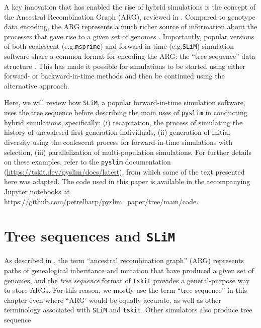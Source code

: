 \documentclass[12pt]{article}
\newcommand{\msprime}[0]{\texttt{msprime}\xspace}
\newcommand{\tskit}[0]{\texttt{tskit}\xspace}
\newcommand{\slim}[0]{\texttt{SLiM}\xspace}
\newcommand{\pyslim}[0]{\texttt{pyslim}\xspace}
\newcommand*{\eg}{e.g.\xcomma}
\begin{document}

A key innovation that has enabled the rise of hybrid simulations is the concept of the Ancestral Recombination Graph (ARG), reviewed in \citet{wong_general_2024}.
Compared to genotype data encoding, the ARG represents a much richer source of information about the processes that gave rise to a given set of genomes \citep{kelleher_efficient_2016}.
Importantly, popular versions of both coalescent (\eg \msprime) and forward-in-time (\eg \slim) simulation software share a common format for
encoding the ARG: the ``tree sequence'' data structure \citep{baumdicker_efficient_2022, haller_tree-sequence_2019}.
This has made it possible for simulations to be started using either forward- or backward-in-time
methods and then be continued using the alternative approach.

Here, we will review how \slim, a popular forward-in-time simulation software, uses the tree sequence before describing
the main uses of \pyslim in conducting hybrid simulations, specifically:
(i) recapitation, the process of simulating the history of uncoalesed first-generation individuals,
(ii) generation of initial diversity using the coalescent process for forward-in-time simulations with selection,
(iii) parallelization of multi-population simulations.
For further details on these examples, refer to the \pyslim{} documentation (\url{https://tskit.dev/pyslim/docs/latest}), from which some of the text presented here was adapted.
The code used in this paper is available in the accompanying Jupyter notebooks at \url{https://github.com/petrelharp/pyslim_paper/tree/main/code}.

\section{Tree sequences and \slim}
As described in \citet{wong_general_2024}, the term ``ancestral recombination graph'' (ARG)
represents paths of genealogical inheritance and mutation that have produced a given set of genomes,
and the \emph{tree sequence} format of \tskit provides a general-purpose way to store ARGs.
For this reason, we mostly use the term ``tree sequence'' in this chapter even where ``ARG'
would be equally accurate, as well as other terminology associated with \slim and \tskit \citep{kelleher_efficient_2016,ralph_efficiently_2020,wong_general_2024}.
Other simulators also produce tree sequence
\end{document}
